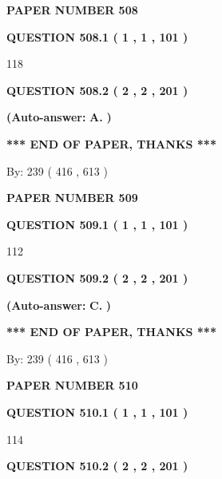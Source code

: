 \documentclass[12pt]{article}
\begin{document}
   
\newpage 
\setcounter{page}{ 
   508001 } 
   
   
 {\textbf{ \Large{ PAPER NUMBER  508  }}}
   
   
   
   
  
  
{\textbf{\large{QUESTION
508.1 
 ( 1 , 1 , 101 )
}}}

118
  
  
{\textbf{\large{QUESTION
508.2 
 ( 2 , 2 , 201 )
}}}
 
 
{\textbf{(Auto-answer:}}
{\textbf{\large{
A.}}}
{\textbf{)}}
 
 
   
   
   
   
\vspace{1.0in} 
{\textbf{\large{ *** END OF PAPER, THANKS *** }}} 
   
   
\hspace{1.0in} By: 
 239 ( 416 ,  613 )
   
   
   
   
\newpage 
\setcounter{page}{ 
   509001 } 
   
   
 {\textbf{ \Large{ PAPER NUMBER  509  }}}
   
   
   
   
  
  
{\textbf{\large{QUESTION
509.1 
 ( 1 , 1 , 101 )
}}}

112
  
  
{\textbf{\large{QUESTION
509.2 
 ( 2 , 2 , 201 )
}}}
 
 
{\textbf{(Auto-answer:}}
{\textbf{\large{
C.}}}
{\textbf{)}}
 
 
   
   
   
   
\vspace{1.0in} 
{\textbf{\large{ *** END OF PAPER, THANKS *** }}} 
   
   
\hspace{1.0in} By: 
 239 ( 416 ,  613 )
   
   
   
   
\newpage 
\setcounter{page}{ 
   510001 } 
   
   
 {\textbf{ \Large{ PAPER NUMBER  510  }}}
   
   
   
   
  
  
{\textbf{\large{QUESTION
510.1 
 ( 1 , 1 , 101 )
}}}

114
  
  
{\textbf{\large{QUESTION
510.2 
 ( 2 , 2 , 201 )
}}}
 
\end{document}
